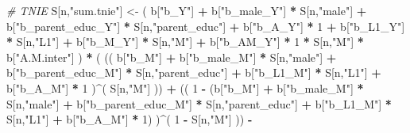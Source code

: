 \documentclass[
]{book}
\newenvironment{Shaded}{\begin{snugshade}}{\end{snugshade}}
\newcommand{\CommentTok}[1]{\textcolor[rgb]{0.56,0.35,0.01}{\textit{#1}}}
\newcommand{\DecValTok}[1]{\textcolor[rgb]{0.00,0.00,0.81}{#1}}
\newcommand{\NormalTok}[1]{#1}
\newcommand{\OtherTok}[1]{\textcolor[rgb]{0.56,0.35,0.01}{#1}}
\newcommand{\SpecialCharTok}[1]{\textcolor[rgb]{0.81,0.36,0.00}{\textbf{#1}}}
\newcommand{\StringTok}[1]{\textcolor[rgb]{0.31,0.60,0.02}{#1}}
\begin{document}
\begin{Shaded}
\begin{Highlighting}[]
    \CommentTok{\# TNIE }
\NormalTok{    S[n,}\StringTok{"sum.tnie"}\NormalTok{] }\OtherTok{\textless{}{-}}\NormalTok{ ( b[}\StringTok{"b\_Y"}\NormalTok{] }\SpecialCharTok{+} 
\NormalTok{                           b[}\StringTok{"b\_male\_Y"}\NormalTok{] }\SpecialCharTok{*}\NormalTok{ S[n,}\StringTok{"male"}\NormalTok{] }\SpecialCharTok{+} 
\NormalTok{                           b[}\StringTok{"b\_parent\_educ\_Y"}\NormalTok{] }\SpecialCharTok{*}\NormalTok{ S[n,}\StringTok{"parent\_educ"}\NormalTok{] }\SpecialCharTok{+} 
\NormalTok{                           b[}\StringTok{"b\_A\_Y"}\NormalTok{] }\SpecialCharTok{*} \DecValTok{1} \SpecialCharTok{+} 
\NormalTok{                           b[}\StringTok{"b\_L1\_Y"}\NormalTok{] }\SpecialCharTok{*}\NormalTok{ S[n,}\StringTok{"L1"}\NormalTok{] }\SpecialCharTok{+}
\NormalTok{                           b[}\StringTok{"b\_M\_Y"}\NormalTok{] }\SpecialCharTok{*}\NormalTok{ S[n,}\StringTok{"M"}\NormalTok{] }\SpecialCharTok{+}
\NormalTok{                           b[}\StringTok{"b\_AM\_Y"}\NormalTok{] }\SpecialCharTok{*} \DecValTok{1} \SpecialCharTok{*}\NormalTok{ S[n,}\StringTok{"M"}\NormalTok{] }\SpecialCharTok{*}\NormalTok{ b[}\StringTok{"A.M.inter"}\NormalTok{] ) }\SpecialCharTok{*}
\NormalTok{      ( (( b[}\StringTok{"b\_M"}\NormalTok{] }\SpecialCharTok{+} 
\NormalTok{             b[}\StringTok{"b\_male\_M"}\NormalTok{] }\SpecialCharTok{*}\NormalTok{ S[n,}\StringTok{"male"}\NormalTok{] }\SpecialCharTok{+} 
\NormalTok{             b[}\StringTok{"b\_parent\_educ\_M"}\NormalTok{] }\SpecialCharTok{*}\NormalTok{ S[n,}\StringTok{"parent\_educ"}\NormalTok{] }\SpecialCharTok{+} 
\NormalTok{             b[}\StringTok{"b\_L1\_M"}\NormalTok{] }\SpecialCharTok{*}\NormalTok{ S[n,}\StringTok{"L1"}\NormalTok{] }\SpecialCharTok{+}
\NormalTok{             b[}\StringTok{"b\_A\_M"}\NormalTok{] }\SpecialCharTok{*} \DecValTok{1}\NormalTok{ )}\SpecialCharTok{\^{}}\NormalTok{( S[n,}\StringTok{"M"}\NormalTok{] )) }\SpecialCharTok{+}
\NormalTok{          (( }\DecValTok{1} \SpecialCharTok{{-}}\NormalTok{ (b[}\StringTok{"b\_M"}\NormalTok{] }\SpecialCharTok{+} 
\NormalTok{                    b[}\StringTok{"b\_male\_M"}\NormalTok{] }\SpecialCharTok{*}\NormalTok{ S[n,}\StringTok{"male"}\NormalTok{] }\SpecialCharTok{+} 
\NormalTok{                    b[}\StringTok{"b\_parent\_educ\_M"}\NormalTok{] }\SpecialCharTok{*}\NormalTok{ S[n,}\StringTok{"parent\_educ"}\NormalTok{] }\SpecialCharTok{+} 
\NormalTok{                    b[}\StringTok{"b\_L1\_M"}\NormalTok{] }\SpecialCharTok{*}\NormalTok{ S[n,}\StringTok{"L1"}\NormalTok{] }\SpecialCharTok{+}
\NormalTok{                    b[}\StringTok{"b\_A\_M"}\NormalTok{] }\SpecialCharTok{*} \DecValTok{1}\NormalTok{) )}\SpecialCharTok{\^{}}\NormalTok{( }\DecValTok{1} \SpecialCharTok{{-}}\NormalTok{ S[n,}\StringTok{"M"}\NormalTok{] )) }\SpecialCharTok{{-}}

\end{Highlighting}
\end{Shaded}
\end{document}
